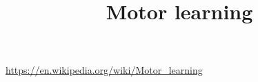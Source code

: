 \documentclass[a4paper]{article}
\title{Motor learning}
\date{}
\begin{document}
    \maketitle
    \url{https://en.wikipedia.org/wiki/Motor_learning}
\end{document}

